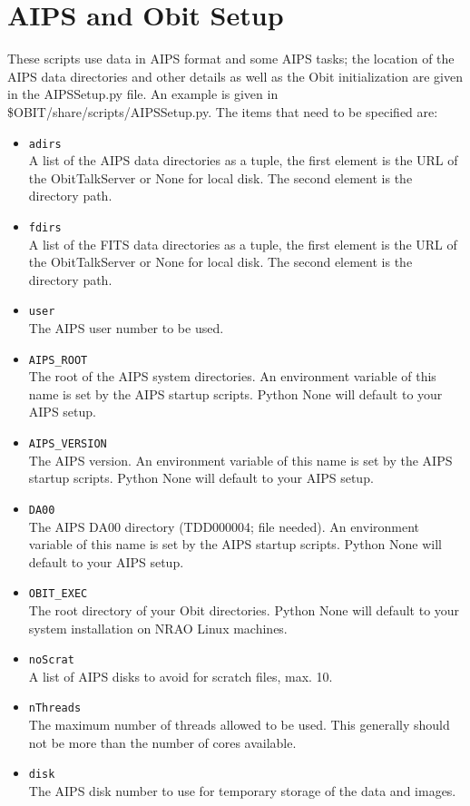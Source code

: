 \documentclass[11pt]{article}
\begin{document}
\section{AIPS and Obit Setup}\label{Setup}
These scripts use data in AIPS format and some AIPS tasks; the
location of the AIPS data directories and other details as well as the
Obit initialization are given in the AIPSSetup.py file.
An example is given in \$OBIT/share/scripts/AIPSSetup.py.
The items that need to be specified are:
\begin{itemize}
\item {\tt adirs} \\
A list of the AIPS data directories as a tuple,  the first element is
the URL of the ObitTalkServer or None for local disk.
The second element is the directory path.
\item {\tt fdirs} \\
A list of the FITS data directories as a tuple,  the first element is
the URL of the ObitTalkServer or None for local disk.
The second element is the directory path.
\item {\tt user} \\
The AIPS user number to be used.
\item {\tt AIPS\_ROOT} \\
The root of the AIPS system directories.
An environment variable of this name is set by the AIPS startup scripts.
Python None will default to your AIPS setup.
\item {\tt AIPS\_VERSION} \\
The  AIPS version.
An environment variable of this name is set by the AIPS startup scripts.
Python None will default to your AIPS setup.
\item {\tt DA00} \\
The  AIPS DA00 directory (TDD000004; file needed).
An environment variable of this name is set by the AIPS startup
scripts.
Python None will default to your AIPS setup.
\item {\tt OBIT\_EXEC} \\
The root directory of your Obit directories.
Python None will default to your system installation on NRAO Linux machines.
\item {\tt noScrat} \\
A list of AIPS disks to avoid for scratch files, max. 10.
\item {\tt nThreads} \\
The maximum number of threads allowed to be used.
This generally should not be more than the number of cores available.
\item {\tt disk} \\
The AIPS disk number to use for temporary storage of the data and images.
\end{itemize}
\end{document}
